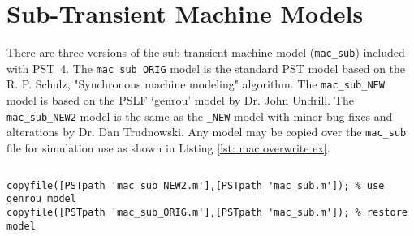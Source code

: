 \section{Sub-Transient Machine Models}  
There are three versions of the sub-transient machine model (\verb|mac_sub|) included with \mbox{PST 4}.
The \verb|mac_sub_ORIG| model is the standard PST model based on the R. P. Schulz, "Synchronous machine modeling" algorithm.
The \verb|mac_sub_NEW| model is based on the PSLF `genrou' model by Dr. John Undrill.
The \verb|mac_sub_NEW2| model is the same as the \verb|_NEW| model with minor bug fixes and alterations by Dr. Dan Trudnowski.
Any model may be copied over the \verb|mac_sub| file for simulation use as shown in Listing \ref{lst: mac overwrite ex}.

\begin{lstlisting}[caption={mac\_sub Overwrite Example},label={lst: mac overwrite ex}]
\end{lstlisting}\vspace{-2 em}
\begin{verbatim}
copyfile([PSTpath 'mac_sub_NEW2.m'],[PSTpath 'mac_sub.m']); % use genrou model
copyfile([PSTpath 'mac_sub_ORIG.m'],[PSTpath 'mac_sub.m']); % restore model
\end{verbatim} 
